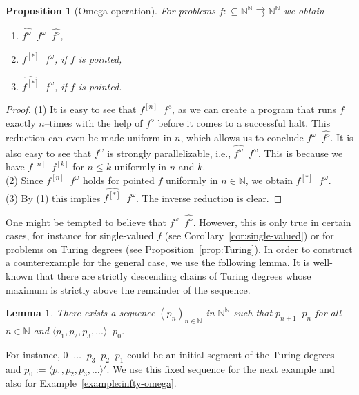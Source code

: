 \documentclass[11pt,a4paper]{amsart}
\theoremstyle{plain}
\newtheorem{lem}[thm]{Lemma}
\newtheorem{prop}[thm]{Proposition}
\theoremstyle{definition}
\theoremstyle{defC}
\theoremstyle{thmC}
\theoremstyle{plain}
\numberwithin{equation}{section}
\def\IN{{\mathbb{N}}}
\def\In{\subseteq}
\def\mto{\rightrightarrows}
\def\lT{\mathop{<_{\mathrm{T}}}}
\def\leqSW{\mathop{\leq_{\mathrm{sW}}}}
\def\equivSW{\mathop{\equiv_{\mathrm{sW}}}}
\def\leqSW{\mathop{\leq_{\mathrm{sW}}}}
\def\equivSW{\mathop{\equiv_{\mathrm{sW}}}}
\begin{document}
\begin{prop}[Omega operation]
\label{prop:omega}
For problems $f:\In\IN^\IN\mto\IN^\IN$ we obtain
\begin{enumerate}
\item $\widehat{f^\omega}\equivSW f^\omega\leqSW\widehat{f^\diamond}$,
\item $f^{[*]}\leqSW f^\omega$, if $f$ is pointed,
\item $\widehat{f^{[*]}}\equivSW f^\omega$, if $f$ is pointed.
\end{enumerate}
\end{prop}
\begin{proof}
(1) It is easy to see that $f^{[n]}\leqSW f^\diamond$, as we can create a program that runs $f$ exactly $n$--times with the help of $f^\diamond$ before it comes to a successful halt.
This reduction can even be made uniform in $n$, which allows us to conclude $f^\omega\leqSW\widehat{f^\diamond}$.
It is also easy to see that $f^\omega$ is strongly parallelizable, i.e., $\widehat{f^\omega}\leqSW f^\omega$. 
This is because we have $f^{[n]}\leqSW f^{[k]}$ for $n\leq k$ uniformly in $n$ and $k$.\\
(2) Since $f^{[n]}\leqSW f^\omega$ holds for pointed $f$ uniformly in $n\in\IN$, we obtain $f^{[*]}\leqSW f^\omega$.\\
(3) By (1) this implies $\widehat{f^{[*]}}\leqSW f^\omega$. The inverse reduction is clear.
\end{proof}

\noindent
One might be tempted to believe that $f^\omega\equivSW\widehat{f^\diamond}$. However, this is only true in certain cases,
for instance for single-valued $f$ (see Corollary~\ref{cor:single-valued}) or for problems on Turing degrees (see Proposition~\ref{prop:Turing}).
In order to construct a counterexample for the general case, we use the following lemma.
It is well-known that there are strictly descending chains of Turing degrees whose maximum is strictly above the remainder of the sequence.

\begin{lem}
\label{lem:Turing}
There exists a sequence $(p_n)_{n\in\IN}$ in $\IN^\IN$ such that 
$p_{n+1}\lT p_n$ for all $n\in\IN$ and $\langle p_1,p_2,p_3,...\rangle\lT p_0$.
\end{lem}

\noindent
For instance, $0\lT \dots\lT p_3\lT p_2\lT p_1$ could be an initial
segment of the Turing degrees~\cite{Hug69} and
$p_0:=\langle p_1,p_2,p_3,\dots\rangle'$.
We use this fixed sequence for the next example and also for Example~\ref{example:infty-omega}.
\end{document}
